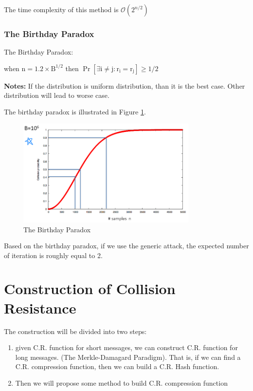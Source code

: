 The time complexity of this method is $\mathcal{O}(2^{n/2})$

\subsubsection{The Birthday Paradox}

\begin{theorem}  The Birthday Paradox:

    when $\mathrm{n}=1.2 \times \mathrm{B}^{1 / 2}$ then $\operatorname{Pr}\left[\exists \mathrm{i} \neq \mathrm{j}: \mathrm{r}_{\mathrm{i}}=\mathrm{r}_{\mathrm{j}}\right] \geq 1 / 2$
\end{theorem}

\textbf{Notes:} If the distribution is uniform distribution, than it is the best case. Other distribution will lead to worse case.

The birthday paradox is illustrated in Figure \ref{fig: Lecture 4: The Birthday Paradox}.

\begin{figure}[h]
    \centering
    \includegraphics[width=0.8\textwidth]{Stanford_Crypto_1/fig/04_Integrity/The birthday paradox.png}
    \caption{The Birthday Paradox}
    \label{fig: Lecture 4: The Birthday Paradox}
\end{figure}

Based on the birthday paradox, if we use the generic attack, the expected number of iteration is roughly equal to 2.

\section{Construction of Collision Resistance}

The construction will be divided into two steps:

\begin{enumerate} [itemsep=2pt,topsep=0pt,parsep=0pt]
    \item given C.R. function for short messages, we can construct C.R. function for long messages. (The Merkle-Damagard Paradigm). That is, if we can find a C.R. compression function, then we can build a C.R. Hash function.
    \item Then we will propose some method to build C.R. compression function
\end{enumerate}

